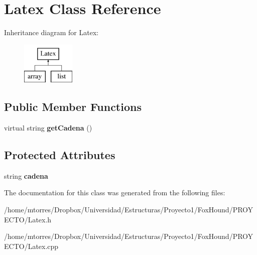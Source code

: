 \hypertarget{class_latex}{\section{Latex Class Reference}
\label{class_latex}
}
Inheritance diagram for Latex\-:\begin{figure}[H]
\begin{center}
\leavevmode
\includegraphics[height=2.000000cm]{class_latex}
\end{center}
\end{figure}
\subsection*{Public Member Functions}
\begin{DoxyCompactItemize}
\item 
\hypertarget{class_latex_ac2bec1a80e34877c5e9f3f091b5afe1a}{virtual string {\bfseries get\-Cadena} ()}\label{class_latex_ac2bec1a80e34877c5e9f3f091b5afe1a}

\end{DoxyCompactItemize}
\subsection*{Protected Attributes}
\begin{DoxyCompactItemize}
\item 
\hypertarget{class_latex_acfaf4978ad2bbd9064f1510995acd4bc}{string {\bfseries cadena}}\label{class_latex_acfaf4978ad2bbd9064f1510995acd4bc}

\end{DoxyCompactItemize}


The documentation for this class was generated from the following files\-:\begin{DoxyCompactItemize}
\item 
/home/mtorres/\-Dropbox/\-Universidad/\-Estructuras/\-Proyecto1/\-Fox\-Hound/\-P\-R\-O\-Y\-E\-C\-T\-O/Latex.\-h\item 
/home/mtorres/\-Dropbox/\-Universidad/\-Estructuras/\-Proyecto1/\-Fox\-Hound/\-P\-R\-O\-Y\-E\-C\-T\-O/Latex.\-cpp\end{DoxyCompactItemize}
